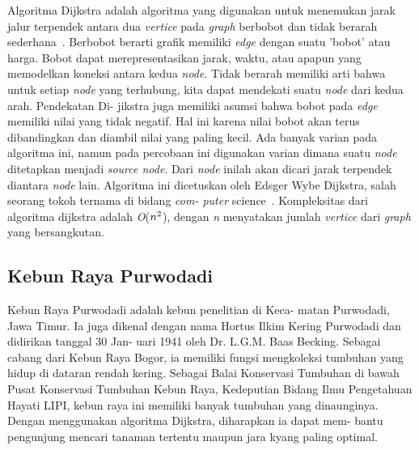 \documentclass[conference]{IEEEtran}
\begin{document}
    Algoritma Dijkstra adalah algoritma yang digunakan untuk
    menemukan  jarak  jalur  terpendek  antara  dua \emph{vertice} pada
    \emph{graph} berbobot  dan  tidak  berarah  sederhana~\cite{rosen-discrete-2012}. Berbobot
    berarti grafik memiliki \emph{edge} dengan suatu ’bobot’ atau harga.
    Bobot  dapat  merepresentasikan  jarak,  waktu,  atau  apapun
    yang  memodelkan  koneksi  antara  kedua \emph{node}.  Tidak  berarah
    memiliki  arti  bahwa  untuk  setiap \emph{node} yang  terhubung,  kita
    dapat mendekati suatu \emph{node} dari kedua arah. Pendekatan Di-
    jikstra juga memiliki asumsi bahwa bobot pada \emph{edge} memiliki
    nilai  yang  tidak  negatif.  Hal  ini  karena  nilai  bobot  akan
    terus  dibandingkan  dan  diambil  nilai  yang  paling  kecil.  Ada
    banyak  varian  pada  algoritma  ini,  namun  pada  percobaan
    ini  digunakan  varian  dimana  suatu \emph{node} ditetapkan  menjadi
    \emph{source node}. Dari \emph{node} inilah  akan  dicari  jarak  terpendek
    diantara \emph{node} lain.  Algoritma  ini  dicetuskan  oleh  Edsger
    Wybe  Dijkstra,  salah  seorang  tokoh  ternama  di  bidang \emph{com-
    puter} science~\cite{dijkstra-note-1959}. Kompleksitas dari algoritma dijkstra adalah
    \emph{O}($n\sp{2}$), dengan \emph{n} menyatakan jumlah \emph{vertice} dari \emph{graph} yang
    bersangkutan.

\subsection{Kebun Raya Purwodadi}
    Kebun  Raya  Purwodadi  adalah  kebun  penelitian  di  Keca-
    matan  Purwodadi,  Jawa  Timur.  Ia  juga  dikenal  dengan  nama
    Hortus Ilkim Kering Purwodadi dan didirikan tanggal 30 Jan-
    uari 1941 oleh Dr. L.G.M. Baas Becking. Sebagai cabang dari
    Kebun Raya Bogor, ia memiliki fungsi mengkoleksi tumbuhan
    yang hidup di dataran rendah kering. Sebagai Balai Konservasi
    Tumbuhan di bawah Pusat Konservasi Tumbuhan Kebun Raya,
    Kedeputian Bidang Ilmu Pengetahuan Hayati LIPI, kebun raya
    ini  memiliki  banyak  tumbuhan  yang  dinaunginya.  Dengan
    menggunakan  algoritma  Dijkstra,  diharapkan  ia  dapat  mem-
    bantu  pengunjung  mencari  tanaman  tertentu  maupun  jara
    kyang paling optimal.
\end{document}
